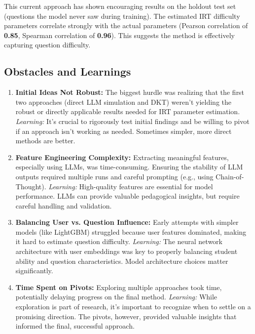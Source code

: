 \documentclass[
    a4paper, %
    10pt, %
    twoside %
]{LTJournalArticle}
\begin{document}
This current approach has shown encouraging results on the holdout test set (questions the model never saw during training). The estimated IRT difficulty parameters correlate strongly with the actual parameters (Pearson correlation of \textbf{0.85}, Spearman correlation of \textbf{0.96}). This suggests the method is effectively capturing question difficulty.

\subsection{Obstacles and Learnings}

\begin{enumerate}
    \item \textbf{Initial Ideas Not Robust:} The biggest hurdle was realizing that the first two approaches (direct LLM simulation and DKT) weren't yielding the robust or directly applicable results needed for IRT parameter estimation.
        \textit{Learning:} It's crucial to rigorously test initial findings and be willing to pivot if an approach isn't working as needed. Sometimes simpler, more direct methods are better.

    \item \textbf{Feature Engineering Complexity:} Extracting meaningful features, especially using LLMs, was time-consuming. Ensuring the stability of LLM outputs required multiple runs and careful prompting (e.g., using Chain-of-Thought).
        \textit{Learning:} High-quality features are essential for model performance. LLMs can provide valuable pedagogical insights, but require careful handling and validation.

    \item \textbf{Balancing User vs. Question Influence:} Early attempts with simpler models (like LightGBM) struggled because user features dominated, making it hard to estimate question difficulty.
        \textit{Learning:} The neural network architecture with user embeddings was key to properly balancing student ability and question characteristics. Model architecture choices matter significantly.

    \item \textbf{Time Spent on Pivots:} Exploring multiple approaches took time, potentially delaying progress on the final method.
        \textit{Learning:} While exploration is part of research, it's important to recognize when to settle on a promising direction. The pivots, however, provided valuable insights that informed the final, successful approach.
\end{enumerate}
\end{document}
